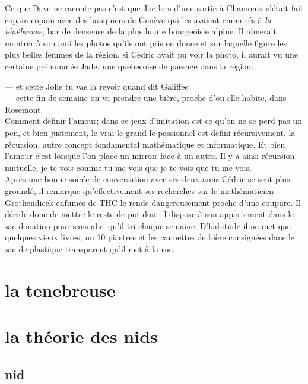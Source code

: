 \documentclass{article}
\begin{document}
Ce que Dave ne raconte pas c'est que Joe lors d'une sortie à Chamonix s'était
fait copain copain avec des banquiers de Genève qui les avaient emmenés à
\textit{la ténébreuse}, bar de denseuse de la plus haute bourgeoisie alpine. Il
aimerait montrer à son ami les photos qu'ils ont pris en douce et sur laquelle
figure les plus belles femmes de la région, si Cédric avait pu voir la photo, il aurait
vu une certaine prénommée Jade, une québecoise de passage dans la région.

--- et cette Jolie tu vas la revoir quand dit Galiffee\\
--- cette fin de semaine on va prendre une bière, proche d'ou elle habite, dans Rosemont.\\

Comment définir l'amour; dans ce jeux d'imitation est-ce qu'on ne se perd pas un
peu, et bien justement, le vrai le grand le passionnel est défini récursivement,
la récursion, autre concept fondamental mathématique et informatique. Et bien
l'amour c'est lorsque l'on place un mirroir face à un autre. Il y a ainsi
récursion mutuelle, je te vois comme tu me vois que je te vois que tu me vois.\\

Après une bonne soirée de conversation avec ses deux amis Cédric se sent plus
groundé, il remarque qu'effectivement ses recherches sur le mathématicien
Grothendieck enfumés de THC le rende dangereusement proche d'une coupure. Il
décide donc de mettre le reste de pot dont il dispose à son appartement dans le
sac donation pour sans abri qu'il tri chaque semaine. D'habitude il ne met que
quelques vieux livres, un 10 piastres et les cannettes de bière consignées dans
le sac de plastique transparent qu'il met à la rue.

\section{la tenebreuse}

\clearpage


\clearpage


\section{la théorie des nids}

\subsection{nid}
\end{document}
